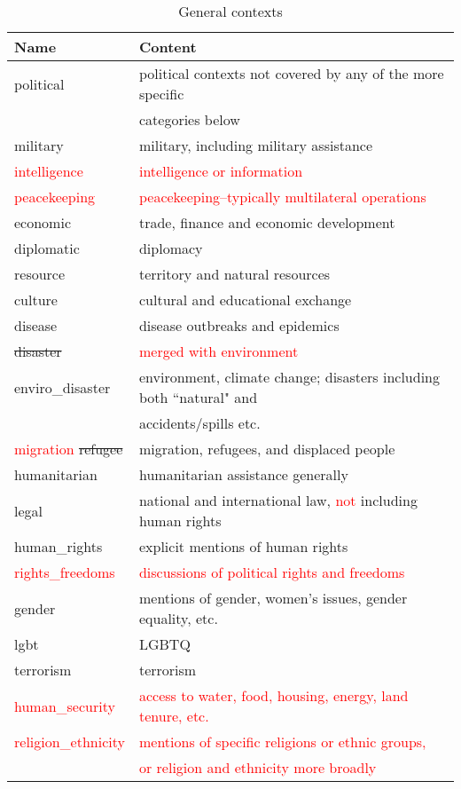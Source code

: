\documentclass[11pt]{report}
\newcommand{\andy}[1]{\textcolor{red}{#1}}
\begin{document}
\begin{table}[htp]
\caption{General contexts }
\begin{center}
\begin{tabular}{|l|l|}
\hline
Name & Content \\
\hline
political & political contexts not covered by any of the more specific \\
& \hspace{6pt}categories below\\
military & military, including military assistance \\
\andy{intelligence} & \andy{intelligence or information} \\
\andy{peacekeeping} & \andy{peacekeeping–typically multilateral operations} \\
economic & trade, finance and economic development \\
diplomatic & diplomacy \\
resource & territory and natural resources \\
culture & cultural and educational exchange \\
disease & disease outbreaks and epidemics \\
\sout{disaster} & \andy{merged with environment} \\
enviro\_disaster & environment, climate change; disasters including both ``natural" and \\&\hspace{6pt} accidents/spills etc.\\
\andy{migration} \sout{refugee} & migration, refugees, and displaced people \\
humanitarian & humanitarian assistance generally \\
legal & national and international law, \andy{not} including human rights \\ 
human\_rights & explicit mentions of human rights \\ 
\andy{rights\_freedoms} & \andy{discussions of political rights and freedoms} \\
gender & mentions of gender, women's issues, gender equality, etc. \\
lgbt & LGBTQ \\
terrorism & terrorism \\
\andy{human\_security} & \andy{access to water, food, housing, energy, land tenure, etc.} \\
\andy{religion\_ethnicity} & \andy{mentions of specific religions or ethnic groups,}  \\&\hspace{6pt} \andy{or religion and ethnicity more broadly} \\

\end{tabular}
\end{center}
\end{table}
\end{document}
